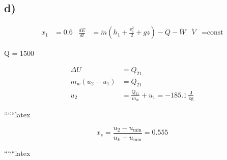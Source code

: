

\subsection*{d)}
\begin{align*}
x_1 &= 0.6 & \frac{dE}{dt} &= \dot{m} (h_{1} + \frac{v_1^2}{2} + gz) - \dot{Q} - \dot{W} & \dot{V} &= \text{const}
\end{align*}

 Q = 1500 \, 

\begin{align*}
\Delta U &= Q_{21} \\
m_w (u_2 - u_1) &= Q_{21} \\
u_2 &= \frac{Q_{21}}{m_w} + u_1 = -185.1 \, \frac{\text{J}}{\text{kg}}
\end{align*}

``````latex

\[
x_s = \frac{u_2 - u_{\text{min}}}{u_k - u_{\text{min}}} = 0.555
\]

``````latex